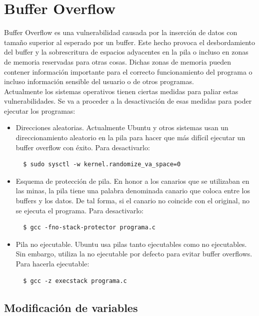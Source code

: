 \documentclass[a4,12pt,onecolum]{article}
\begin{document}
\clearpage
\section{Buffer Overflow}

Buffer Overflow es una vulnerabilidad causada por la inserción de datos con tamaño superior al esperado por un buffer. Este hecho provoca el desbordamiento del buffer y la sobrescritura de espacios adyacentes en la pila o incluso en zonas de memoria reservadas para otras cosas. Dichas zonas de memoria pueden contener información
importante para el correcto funcionamiento del programa o incluso información sensible del usuario o de otros programas. \\

Actualmente los sistemas operativos tienen ciertas medidas para paliar estas vulnerabilidades. Se va a proceder a la desactivación de esas medidas para poder ejecutar los programas:

\begin{itemize}
  \item Direcciones aleatorias. Actualmente Ubuntu y otros sistemas usan un direccionamiento aleatorio en la pila para hacer que más difícil ejecutar un buffer overflow con éxito. Para desactivarlo:
  \begin{verbatim}
  $ sudo sysctl -w kernel.randomize_va_space=0
  \end{verbatim}

  \item Esquema de protección de pila. En honor a los canarios que se utilizaban en las minas, la pila tiene una palabra denominada canario que coloca entre los buffers y los datos. De tal forma, si el canario no coincide con el original, no se ejecuta el programa. Para desactivarlo:
  \begin{verbatim}
  $ gcc -fno-stack-protector programa.c
  \end{verbatim}

  \item Pila no ejecutable. Ubuntu usa pilas tanto ejecutables como no ejecutables. Sin embargo, utiliza la no ejecutable por defecto para evitar buffer overflows. Para hacerla ejecutable:
  \begin{verbatim}
  $ gcc -z execstack programa.c
  \end{verbatim}
\end{itemize}

\subsection{Modificación de variables}
\end{document}
